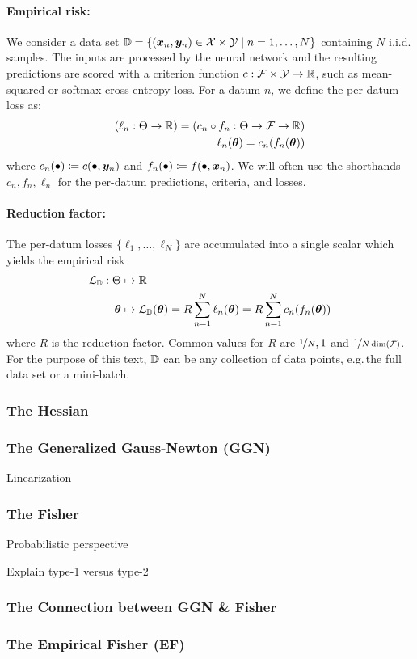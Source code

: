 \paragraph{Empirical risk:} We consider a data set ${\mathbb{D}} = \{({\bm{x}}_n, {\bm{y}}_n) \in {\mathcal{X}} \times {\mathcal{Y}} \mid n = 1, \dots, N \}$ containing $N$ i.i.d.\,samples.
The inputs are processed by the neural network and the resulting predictions are scored with a criterion function $c: {\mathcal{F}} \times {\mathcal{Y}} \to {\mathbb{R}}$, such as mean-squared or softmax cross-entropy loss.
For a datum $n$, we define the per-datum loss as:
\begin{align*}
  (\ell_n: \Theta \to {\mathbb{R}}) = (c_n \circ f_n: \Theta \to {\mathcal{F}} \to {\mathbb{R}})
  \\
  \ell_n({\bm{\theta}}) = c_n(f_n({\bm{\theta}}))
\end{align*}
where $c_n(\bullet) \coloneq c(\bullet, {\bm{y}}_n)$ and $f_n(\bullet) \coloneq f(\bullet, {\bm{x}}_n)$.
We will often use the shorthands $c_n, f_n, \ell_n$ for the per-datum predictions, criteria, and losses.

\paragraph{Reduction factor:} The per-datum losses $\{\ell_1, \dots, \ell_N\}$ are accumulated into a single scalar which yields the empirical risk
\begin{align*}
  {\mathcal{L}}_{{\mathbb{D}}}: \Theta &\mapsto {\mathbb{R}}
  \\
  {\bm{\theta}} &\mapsto {\mathcal{L}}_{{\mathbb{D}}}({\bm{\theta}}) = R \sum_{n=1}^N \ell_n({\bm{\theta}}) = R \sum_{n=1}^N c_n(f_n({\bm{\theta}}))
\end{align*}
where $R$ is the reduction factor. Common values for $R$ are $\nicefrac{1}{N}, 1$ and $\nicefrac{1}{N \dim({\mathcal{F}})}$.
For the purpose of this text, ${\mathbb{D}}$ can be any collection of data points, e.g.\,the full data set or a mini-batch.

\subsubsection{The Hessian}\label{sec:basics_dl_hessian}


\subsubsection{The Generalized Gauss-Newton (GGN)}
Linearization

\subsubsection{The Fisher}
Probabilistic perspective

Explain type-1 versus type-2
\subsubsection{The Connection between GGN \& Fisher}
\subsubsection{The Empirical Fisher (EF)}

